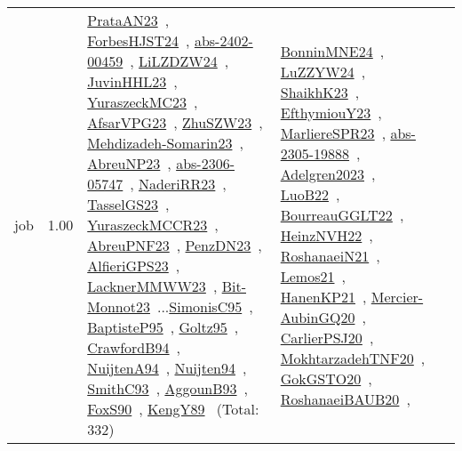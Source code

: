 {\begin{longtable}{p{3cm}r>{\raggedright\arraybackslash}p{6cm}>{\raggedright\arraybackslash}p{6cm}>{\raggedright\arraybackslash}p{8cm}}
\index{job}\index{Scheduling!job}job &  1.00 & \href{../works/PrataAN23.pdf}{PrataAN23}~\cite{PrataAN23}, \href{../works/ForbesHJST24.pdf}{ForbesHJST24}~\cite{ForbesHJST24}, \href{../works/abs-2402-00459.pdf}{abs-2402-00459}~\cite{abs-2402-00459}, \href{../works/LiLZDZW24.pdf}{LiLZDZW24}~\cite{LiLZDZW24}, \href{../works/JuvinHHL23.pdf}{JuvinHHL23}~\cite{JuvinHHL23}, \href{../works/YuraszeckMC23.pdf}{YuraszeckMC23}~\cite{YuraszeckMC23}, \href{../works/AfsarVPG23.pdf}{AfsarVPG23}~\cite{AfsarVPG23}, \href{../works/ZhuSZW23.pdf}{ZhuSZW23}~\cite{ZhuSZW23}, \href{../works/Mehdizadeh-Somarin23.pdf}{Mehdizadeh-Somarin23}~\cite{Mehdizadeh-Somarin23}, \href{../works/AbreuNP23.pdf}{AbreuNP23}~\cite{AbreuNP23}, \href{../works/abs-2306-05747.pdf}{abs-2306-05747}~\cite{abs-2306-05747}, \href{../works/NaderiRR23.pdf}{NaderiRR23}~\cite{NaderiRR23}, \href{../works/TasselGS23.pdf}{TasselGS23}~\cite{TasselGS23}, \href{../works/YuraszeckMCCR23.pdf}{YuraszeckMCCR23}~\cite{YuraszeckMCCR23}, \href{../works/AbreuPNF23.pdf}{AbreuPNF23}~\cite{AbreuPNF23}, \href{../works/PenzDN23.pdf}{PenzDN23}~\cite{PenzDN23}, \href{../works/AlfieriGPS23.pdf}{AlfieriGPS23}~\cite{AlfieriGPS23}, \href{../works/LacknerMMWW23.pdf}{LacknerMMWW23}~\cite{LacknerMMWW23}, \href{../works/Bit-Monnot23.pdf}{Bit-Monnot23}~\cite{Bit-Monnot23}...\href{../works/SimonisC95.pdf}{SimonisC95}~\cite{SimonisC95}, \href{../works/BaptisteP95.pdf}{BaptisteP95}~\cite{BaptisteP95}, \href{../works/Goltz95.pdf}{Goltz95}~\cite{Goltz95}, \href{../works/CrawfordB94.pdf}{CrawfordB94}~\cite{CrawfordB94}, \href{../works/NuijtenA94.pdf}{NuijtenA94}~\cite{NuijtenA94}, \href{../works/Nuijten94.pdf}{Nuijten94}~\cite{Nuijten94}, \href{../works/SmithC93.pdf}{SmithC93}~\cite{SmithC93}, \href{../works/AggounB93.pdf}{AggounB93}~\cite{AggounB93}, \href{../works/FoxS90.pdf}{FoxS90}~\cite{FoxS90}, \href{../works/KengY89.pdf}{KengY89}~\cite{KengY89} (Total: 332) & \href{../works/BonninMNE24.pdf}{BonninMNE24}~\cite{BonninMNE24}, \href{../works/LuZZYW24.pdf}{LuZZYW24}~\cite{LuZZYW24}, \href{../works/ShaikhK23.pdf}{ShaikhK23}~\cite{ShaikhK23}, \href{../works/EfthymiouY23.pdf}{EfthymiouY23}~\cite{EfthymiouY23}, \href{../works/MarliereSPR23.pdf}{MarliereSPR23}~\cite{MarliereSPR23}, \href{../works/abs-2305-19888.pdf}{abs-2305-19888}~\cite{abs-2305-19888}, \href{../works/Adelgren2023.pdf}{Adelgren2023}~\cite{Adelgren2023}, \href{../works/LuoB22.pdf}{LuoB22}~\cite{LuoB22}, \href{../works/BourreauGGLT22.pdf}{BourreauGGLT22}~\cite{BourreauGGLT22}, \href{../works/HeinzNVH22.pdf}{HeinzNVH22}~\cite{HeinzNVH22}, \href{../works/RoshanaeiN21.pdf}{RoshanaeiN21}~\cite{RoshanaeiN21}, \href{../works/Lemos21.pdf}{Lemos21}~\cite{Lemos21}, \href{../works/HanenKP21.pdf}{HanenKP21}~\cite{HanenKP21}, \href{../works/Mercier-AubinGQ20.pdf}{Mercier-AubinGQ20}~\cite{Mercier-AubinGQ20}, \href{../works/CarlierPSJ20.pdf}{CarlierPSJ20}~\cite{CarlierPSJ20}, \href{../works/MokhtarzadehTNF20.pdf}{MokhtarzadehTNF20}~\cite{MokhtarzadehTNF20}, \href{../works/GokGSTO20.pdf}{GokGSTO20}~\cite{GokGSTO20}, \href{../works/RoshanaeiBAUB20.pdf}{RoshanaeiBAUB20}~\cite{RoshanaeiBAUB20}, 
\end{longtable}}
